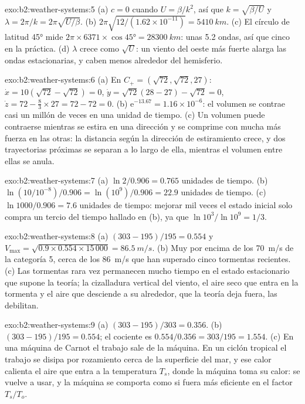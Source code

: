 \begin{solution}{exo:b2:weather-systems:5}
(a) $c = 0$ cuando $U = \beta/k^2$, así que $k = \sqrt{\beta/U}$ y $\lambda = 2\pi/k =
2\pi\sqrt{U/\beta}$. (b) $2\pi\sqrt{12/(1.62 \times 10^{-11})} = \qty{5410}{km}$. (c) El círculo
de latitud \ang{45} mide $2\pi \times 6371 \times \cos\ang{45} = \qty{28300}{km}$: unas 5.2
ondas, así que cinco en la práctica. (d) $\lambda$ crece como $\sqrt U$: un viento del oeste más fuerte alarga las
ondas estacionarias, y caben menos alrededor del hemisferio.
\end{solution}

\begin{solution}{exo:b2:weather-systems:6}
(a) En $C_+ = (\sqrt{72}, \sqrt{72}, 27)$: $\dot x = 10(\sqrt{72} - \sqrt{72}) = 0$, $\dot y =
\sqrt{72}(28 - 27) - \sqrt{72} = 0$, $\dot z = 72 - \tfrac83 \times 27 = 72 - 72 = 0$.
(b) $\mathrm{e}^{-13.67} = 1.16 \times 10^{-6}$: el volumen se contrae casi un millón de veces en una
unidad de tiempo. (c) Un volumen puede contraerse mientras se estira en una dirección y se comprime con mucha más
fuerza en las otras: la distancia según la dirección de estiramiento crece, y dos trayectorias próximas
se separan a lo largo de ella, mientras el volumen entre ellas se anula.
\end{solution}

\begin{solution}{exo:b2:weather-systems:7}
(a) $\ln 2/0.906 = 0.765$ unidades de tiempo. (b) $\ln(10/10^{-8})/0.906 = \ln(10^9)/0.906 = 22.9$ unidades
de tiempo. (c) $\ln 1000/0.906 = 7.6$ unidades de tiempo: mejorar mil veces el estado inicial
solo compra un tercio del tiempo hallado en (b), ya que $\ln 10^3/\ln 10^9 = 1/3$.
\end{solution}

\begin{solution}{exo:b2:weather-systems:8}
(a) $(303 - 195)/195 = 0.554$ y $V_{\max} = \sqrt{0.9 \times 0.554 \times 15\,000} =
\qty{86.5}{m/s}$. (b) Muy por encima de los \qty{70}{m/s} de la categoría 5, cerca de los \qty{86}{m/s} que
han superado cinco tormentas recientes. (c) Las tormentas rara vez permanecen mucho tiempo en el estado estacionario que supone
la teoría; la cizalladura vertical del viento, el aire seco que entra en la tormenta y el aire que desciende a su alrededor, que
la teoría deja fuera, las debilitan.
\end{solution}

\begin{solution}{exo:b2:weather-systems:9}
(a) $(303 - 195)/303 = 0.356$. (b) $(303 - 195)/195 = 0.554$; el cociente es $0.554/0.356 =
303/195 = 1.554$. (c) En una máquina de Carnot el trabajo sale de la máquina. En un ciclón tropical el
trabajo se disipa por rozamiento cerca de la superficie del mar, y ese calor calienta el aire que entra a la
temperatura $T_s$, donde la máquina toma su calor: se vuelve a usar, y la máquina se comporta
como si fuera más eficiente en el factor $T_s/T_o$.
\end{solution}

